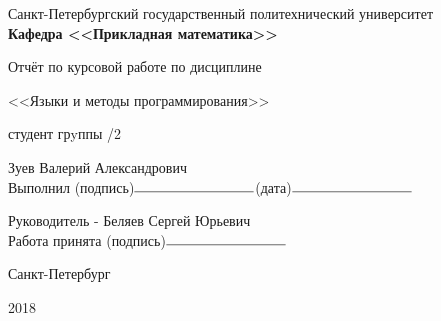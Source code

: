 \documentclass[zuev-23631-2-report.tex]{subfiles}
\begin{document}
\begin{titlepage}
\begin{centering}

Санкт-Петербургский государственный политехнический университет\\

\textbf{Кафедра <<Прикладная математика>>}
\par
\vfill

\large
Отчёт по курсовой работе по дисциплине\\
\par
<<Языки и методы программирования>>
\vfill

\begin{flushleft}
студент грyппы /2\\
\par
Зуев Валерий Александрович\\
Выполнил (подпись)$\rule{3cm}{0.15mm}$(дата)$\rule{3cm}{0.15mm}$
\end{flushleft}
\begin{flushleft}
Руководитель - Беляев Сергей Юрьевич\\
Работа принята (подпись)$\rule{3cm}{0.15mm}$
\end{flushleft}
\vfill
\normalsize

Санкт-Петербург
\par
2018

\end{centering}
\end{titlepage}
\end{document}
